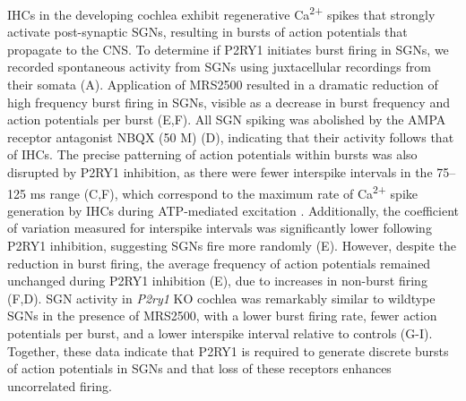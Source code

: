 \documentclass[9pt,lineno]{elife}
\begin{document}
IHCs in the developing cochlea exhibit regenerative Ca\textsuperscript{2+} spikes that strongly activate post-synaptic SGNs, resulting in bursts of action potentials that propagate to the CNS. To determine if P2RY1 initiates burst firing in SGNs, we recorded spontaneous activity from SGNs using juxtacellular recordings from their somata (A). Application of MRS2500 resulted in a dramatic reduction of high frequency burst firing in SGNs, visible as a decrease in burst frequency and action potentials per burst (E,F). All SGN spiking was abolished by the AMPA receptor antagonist NBQX (50 \textmu M) (D), indicating that their activity follows that of IHCs. The precise patterning of action potentials within bursts was also disrupted by P2RY1 inhibition, as there were fewer interspike intervals in the 75--125 ms range (C,F), which correspond to the maximum rate of Ca\textsuperscript{2+} spike generation by IHCs during ATP-mediated excitation \citep{Tritsch2010a}. Additionally, the coefficient of variation measured for interspike intervals was significantly lower following P2RY1 inhibition, suggesting SGNs fire more randomly (E). However, despite the reduction in burst firing, the average frequency of action potentials remained unchanged during P2RY1 inhibition (E), due to increases in non-burst firing (F,D). SGN activity in \textit{P2ry1} KO cochlea was remarkably similar to wildtype SGNs in the presence of MRS2500, with a lower burst firing rate, fewer action potentials per burst, and a lower interspike interval relative to controls (G-I). Together, these data indicate that P2RY1 is required to generate discrete bursts of action potentials in SGNs and that loss of these receptors enhances uncorrelated firing.
\end{document}
